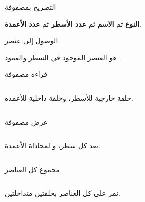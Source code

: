 \documentclass[aspectratio=169, 11pt, t, xcolor={table}]{beamer}
\begin{document}
\begin{frame}{التصريح بمصفوفة}
    \begin{center}
    \begin{minipage}{0.65\textwidth}
    \end{minipage}
    \end{center}
    \vspace{0.3cm}
    \textbf{النوع} ثم \textbf{الاسم} ثم \textbf{عدد الأسطر} ثم \textbf{عدد الأعمدة}.
\end{frame}

\begin{frame}{الوصول إلى عنصر}
    \begin{center}
    \begin{minipage}{0.7\textwidth}
    \end{minipage}
    \end{center}
    \vspace{0.3cm}
     هو العنصر الموجود في السطر  والعمود .
\end{frame}

\begin{frame}{قراءة مصفوفة}
    \begin{columns}[T]
        حلقة خارجية للأسطر، وحلقة داخلية للأعمدة.
    \end{columns}
\end{frame}

\begin{frame}{عرض مصفوفة}
    \begin{columns}[T]
        \vspace{0.3cm}
         بعد كل سطر، و لمحاذاة الأعمدة.
    \end{columns}
\end{frame}

\begin{frame}{مجموع كل العناصر}
    \begin{columns}[T]
    \end{columns}
    \vspace{0.3cm}
    نمر على كل العناصر بحلقتين متداخلتين.
\end{frame}
\end{document}
